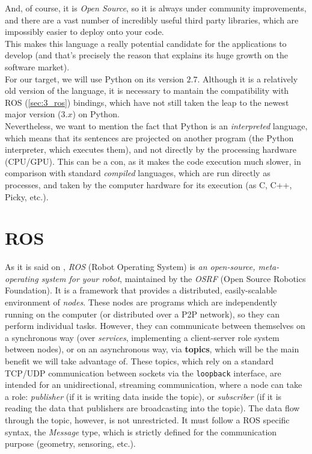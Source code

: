 	And, of course, it is \textit{Open Source}, so it is always under community improvements, and there are a vast number of incredibly useful third party libraries, which are impossibly easier to deploy onto your code.\\
	
	This makes this language a really potential candidate for the applications to develop (and that's precisely the reason that explains its huge growth on the software market).\\
	
	For our target, we will use Python on its version $2.7$. Although it is a relatively old version of the language, it is necessary to mantain the compatibility with ROS (\autoref{sec:3_ros}) bindings, which have not still taken the leap to the newest major version ($3.x$) on Python.\\
	
	Nevertheless, we want to mention the fact that Python is an \emph{interpreted} language, which means that its sentences are projected on another program (the Python interpreter, which executes them), and not directly by the processing hardware (CPU/GPU). This can be a con, as it makes the code execution much slower, in comparison with standard \emph{compiled} languages, which are run directly as processes, and taken by the computer hardware for its execution (as C, C++, Picky, etc.).

\section{ROS}
	\label{sec:3_ros}
	As it is said on \cite{ros-intro}, \emph{ROS} (Robot Operating System) is \textit{an open-source, meta-operating system for your robot}, maintained by the \emph{OSRF} (Open Source Robotics Foundation). It is a framework that provides a distributed, easily-scalable environment of \emph{nodes}. These nodes are programs which are independently running on the computer (or distributed over a P2P network), so they can perform individual tasks. However, they can communicate between themselves on a synchronous way (over \emph{services}, implementing a client-server role system between nodes), or on an asynchronous way, via \textbf{topics}, which will be the main benefit we will take advantage of. These topics, which rely on a standard TCP/UDP communication between sockets via the \texttt{loopback} interface, are intended for an unidirectional, streaming communication, where a node can take a role: \emph{publisher} (if it is writing data inside the topic), or \emph{subscriber} (if it is reading the data that publishers are broadcasting into the topic). The data flow through the topic, however, is not unrestricted. It must follow a ROS specific syntax, the \emph{Message} type, which is strictly defined for the communication purpose (geometry, sensoring, etc.).\\
	
